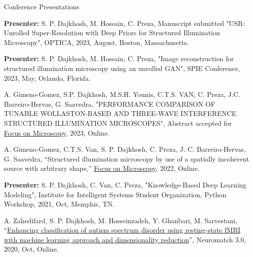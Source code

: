 \begin{cventries}
  \cventry
    {} %
    {Conference Presentations} %
    {} %
    {} %
    {
      \begin{cvitems} %
      \item{\textbf{Presenter:} S. P. Dajkhosh, M. Hossain,  C. Preza, Manuscript submitted "USR: Unrolled Super-Resolution with Deep Priors for Structured Illumination Microscopy", OPTICA, 2023, August, Boston, Massachusetts.}
        \item{\textbf{Presenter:} S. P. Dajkhosh, M. Hossain, C. Preza, "Image reconstruction for structured illumination microscopy using an unrolled GAN", SPIE Conference, 2023, May, Orlando, Florida.}
        \item{A. Gimeno-Gomez, S.P. Dajkhosh, M.S.H. Younis, C.T.S. VAN, C. Preza, J.C. Barreiro-Hervas, G. Saavedra, "PERFORMANCE COMPARISON OF TUNABLE WOLLASTON-BASED AND THREE-WAVE INTERFERENCE STRUCTURED ILLUMINATION MICROSCOPES", Abstract accepted for \href{https://www.focusonmicroscopy.org/}{Focus on Microscopy}, 2023, Online.}
        \item{A. Gimeno-Gomez, C.T.S. Van, S. P. Dajkhosh, C. Preza, J. C. Barreiro-Hervas, G. Saavedra, “Structured illumination microscopy by use of a spatially incoherent source with arbitrary shape,” \href{https://www.focusonmicroscopy.org/}{Focus on Microscopy}, 2022, Online.}
        \item{\textbf{Presenter: }S. P. Dajkhosh, C. Van, C. Preza, "Knowledge-Based Deep Learning Modeling", Institute for Intelligent Systems Student Organization, Python Workshop, 2021, Oct, Memphis, TN.}
        \item{A. Zahedifard, S. P. Dajkhosh, M. Hosseinzadeh, Y. Ghanbari, M. Sarvestani, “\href{https://neural-reckoning.github.io/nmc3_provisional_schedule/abstracts/anis-zahedifard-enhancing-classification-of-autism-spectrum.html}{Enhancing classification of autism spectrum disorder using resting-state fMRI with machine learning approach and dimensionality reduction}”, Neuromatch 3.0, 2020, Oct, Online.}
      \end{cvitems}
    }



\end{cventries}
